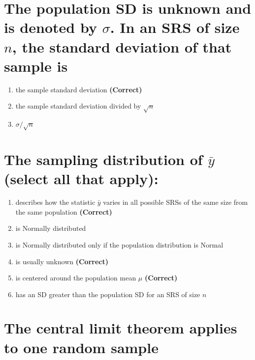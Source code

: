 \documentclass[letterpaper,10pt,twoside,printwatermark=false]{pinp}
\providecommand{\tightlist}{%
  \setlength{\itemsep}{0pt}\setlength{\parskip}{0pt}}
\begin{document}
\section{\texorpdfstring{The population SD is unknown and is denoted by
\(\sigma\). In an SRS of size \(n\), the standard deviation of that
sample
is}{The population SD is unknown and is denoted by \textbackslash{}sigma. In an SRS of size n, the standard deviation of that sample is}}\label{the-population-sd-is-unknown-and-is-denoted-by-sigma.-in-an-srs-of-size-n-the-standard-deviation-of-that-sample-is}

\begin{enumerate}
\def\labelenumi{\arabic{enumi}.}
\tightlist
\item
  the sample standard deviation \textbf{(Correct)}
\item
  the sample standard deviation divided by \(\sqrt{n}\)
\item
  \(\sigma / \sqrt{n}\)
\end{enumerate}

\section{\texorpdfstring{The sampling distribution of \(\bar{y}\)
(select all that
apply):}{The sampling distribution of \textbackslash{}bar\{y\} (select all that apply):}}\label{the-sampling-distribution-of-bary-select-all-that-apply}

\begin{enumerate}
\def\labelenumi{\arabic{enumi}.}
\tightlist
\item
  describes how the statistic \(\bar{y}\) varies in all possible SRSs of
  the same size from the same population \textbf{(Correct)}
\item
  is Normally distributed
\item
  is Normally distributed only if the population distribution is Normal
\item
  is usually unknown \textbf{(Correct)}
\item
  is centered around the population mean \(\mu\) \textbf{(Correct)}
\item
  has an SD greater than the population SD for an SRS of size \(n\)
\end{enumerate}

\section{The central limit theorem applies to one random
sample}\label{the-central-limit-theorem-applies-to-one-random-sample}
\end{document}
